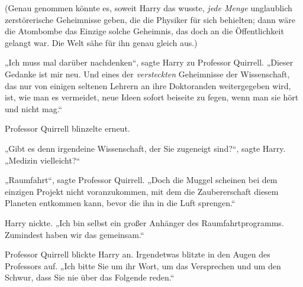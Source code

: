 (Genau genommen könnte es, soweit Harry das wusste, \emph{jede Menge} unglaublich zerstörerische Geheimnisse geben, die die Physiker für sich behielten; dann wäre die Atombombe das Einzige solche Geheimnis, das doch an die Öffentlichkeit gelangt war. Die Welt sähe für ihn genau gleich aus.)

„Ich muss mal darüber nachdenken“, sagte Harry zu Professor Quirrell. „Dieser Gedanke ist mir neu. Und eines der \emph{versteckten} Geheimnisse der Wissenschaft, das nur von einigen seltenen Lehrern an ihre Doktoranden weitergegeben wird, ist, wie man es vermeidet, neue Ideen sofort beiseite zu fegen, wenn man sie hört und nicht mag.“

Professor Quirrell blinzelte erneut.

„Gibt es denn irgendeine Wissenschaft, der Sie zugeneigt sind?“, sagte Harry. „Medizin vielleicht?“

„Raumfahrt“, sagte Professor Quirrell. „Doch die Muggel scheinen bei dem einzigen Projekt nicht voranzukommen, mit dem die Zaubererschaft diesem Planeten entkommen kann, bevor die ihn in die Luft sprengen.“

Harry nickte. „Ich bin selbst ein großer Anhänger des Raumfahrtprogramms. Zumindest haben wir das gemeinsam.“

Professor Quirrell blickte Harry an. Irgendetwas blitzte in den Augen des Professors auf. „Ich bitte Sie um ihr Wort, um das Versprechen und um den Schwur, dass Sie nie über das Folgende reden.“

